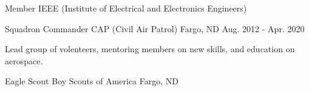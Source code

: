 

\begin{cventries}

  \cventry
    {Member} %
    {IEEE (Institute of Electrical and Electronics Engineers)} %
    {} %
    {} %
    {
      \begin{cvitems} %
      \end{cvitems}
    }

  \cventry
    {Squadron Commander} %
    {CAP (Civil Air Patrol)} %
    {Fargo, ND} %
    {Aug. 2012 - Apr. 2020} %
    {
      \begin{cvitems} %
        \item {Lead group of volenteers, mentoring members on new skills, and education on aerospace.}
      \end{cvitems}
    }

  \cventry
    {Eagle Scout} %
    {Boy Scouts of America} %
    {Fargo, ND} %
    {} %
    {
      \begin{cvitems} %
      \end{cvitems}
    }

\end{cventries}
